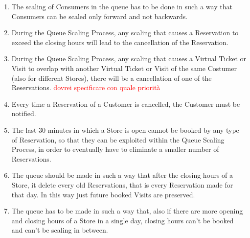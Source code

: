 \documentclass[a4paper, 10pt, oneside]{article}
\newcommand*{\lorenzo}[1]{\textcolor{BurntOrange}{#1}}
\newcommand{\yasmin}[1]{\textcolor{Red}{#1}}
\begin{document}
\begin{enumerate}[align=left, label={R.\arabic{*}}]
\begin{enumerate}[label={-}]
        \item \label{req:codeUnique:queueScaling} The scaling of Consumers in the queue has to be done in such a way that Consumers can be scaled only forward and not backwards. %
        \item \label{req:codeUnique:scalingExceed} During the Queue Scaling Process, any scaling that causes a Reservation to exceed the closing hours will lead to the cancellation of the Reservation.
        \item \label{req:codeUnique:scalingOverlap} During the Queue Scaling Process, any scaling that causes a Virtual Ticket or Visit to overlap with another Virtual Ticket or Visit of the same Costumer (also for different Stores), there will be a cancellation of one of the Reservations. \yasmin{dovrei specificare con quale priorità} 
        \item \label{req:codeUnique:queueNotifications} Every time a Reservation of a Customer is cancelled, the Customer must be notified.
        \item \label{req:codeUnique:queueLast30} The last 30 minutes in which a Store is open cannot be booked by any type of Reservation, so that they can be exploited within the Queue Scaling Process, in order to eventually have to eliminate a smaller number of Reservations.
        \item \label{req:codeUnique:reset} The queue should be made in such a way that after the closing hours of a Store, it delete every old Reservations, that is every Reservation made for that day. In this way just future booked Visits are preserved.
        \item \label{moreOpeningHours} The queue has to be made in such a way that, also if there are more opening and closing hours of a Store in a single day,%
        closing hours can't be booked and can't be scaling in between.%
        
    \end{enumerate}


\end{enumerate}
\end{document}
